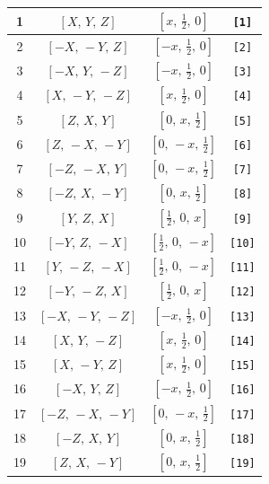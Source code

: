 \documentclass[fleqn,8pt]{jsarticle}
\begin{document}
\begin{longtable}{cccc}
1 & $\left[ X,\, Y,\, Z \right]$ & $\left[ x,\, \frac{1}{2},\, 0 \right]$ & {\tt [1]} \\ \hline
2 & $\left[ - X,\, - Y,\, Z \right]$ & $\left[ - x,\, \frac{1}{2},\, 0 \right]$ & {\tt [2]} \\ \hline
3 & $\left[ - X,\, Y,\, - Z \right]$ & $\left[ - x,\, \frac{1}{2},\, 0 \right]$ & {\tt [3]} \\ \hline
4 & $\left[ X,\, - Y,\, - Z \right]$ & $\left[ x,\, \frac{1}{2},\, 0 \right]$ & {\tt [4]} \\ \hline
5 & $\left[ Z,\, X,\, Y \right]$ & $\left[ 0,\, x,\, \frac{1}{2} \right]$ & {\tt [5]} \\ \hline
6 & $\left[ Z,\, - X,\, - Y \right]$ & $\left[ 0,\, - x,\, \frac{1}{2} \right]$ & {\tt [6]} \\ \hline
7 & $\left[ - Z,\, - X,\, Y \right]$ & $\left[ 0,\, - x,\, \frac{1}{2} \right]$ & {\tt [7]} \\ \hline
8 & $\left[ - Z,\, X,\, - Y \right]$ & $\left[ 0,\, x,\, \frac{1}{2} \right]$ & {\tt [8]} \\ \hline
9 & $\left[ Y,\, Z,\, X \right]$ & $\left[ \frac{1}{2},\, 0,\, x \right]$ & {\tt [9]} \\ \hline
10 & $\left[ - Y,\, Z,\, - X \right]$ & $\left[ \frac{1}{2},\, 0,\, - x \right]$ & {\tt [10]} \\ \hline
11 & $\left[ Y,\, - Z,\, - X \right]$ & $\left[ \frac{1}{2},\, 0,\, - x \right]$ & {\tt [11]} \\ \hline
12 & $\left[ - Y,\, - Z,\, X \right]$ & $\left[ \frac{1}{2},\, 0,\, x \right]$ & {\tt [12]} \\ \hline
13 & $\left[ - X,\, - Y,\, - Z \right]$ & $\left[ - x,\, \frac{1}{2},\, 0 \right]$ & {\tt [13]} \\ \hline
14 & $\left[ X,\, Y,\, - Z \right]$ & $\left[ x,\, \frac{1}{2},\, 0 \right]$ & {\tt [14]} \\ \hline
15 & $\left[ X,\, - Y,\, Z \right]$ & $\left[ x,\, \frac{1}{2},\, 0 \right]$ & {\tt [15]} \\ \hline
16 & $\left[ - X,\, Y,\, Z \right]$ & $\left[ - x,\, \frac{1}{2},\, 0 \right]$ & {\tt [16]} \\ \hline
17 & $\left[ - Z,\, - X,\, - Y \right]$ & $\left[ 0,\, - x,\, \frac{1}{2} \right]$ & {\tt [17]} \\ \hline
18 & $\left[ - Z,\, X,\, Y \right]$ & $\left[ 0,\, x,\, \frac{1}{2} \right]$ & {\tt [18]} \\ \hline
19 & $\left[ Z,\, X,\, - Y \right]$ & $\left[ 0,\, x,\, \frac{1}{2} \right]$ & {\tt [19]} \\ \hline

\end{longtable}
\end{document}
